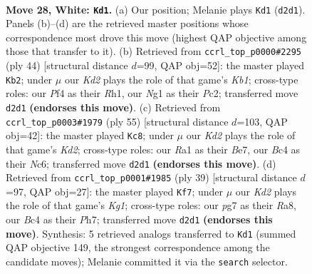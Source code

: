 \documentclass[11pt]{article}
\begin{document}
\clearpage

\begin{figure}[p]\centering
\begin{subfigure}{0.46\textwidth}\centering
\resizebox{\linewidth}{!}{%
\newchessgame
\chessboard[
  setfen={2r2b2/2nkn1pr/6b1/7p/p1B1pP1P/P3R3/1P1K2P1/R5NN w - - 16 28},
  showmover=false,
  pgfstyle=straightmove, color=movearrow, markmove={d2-d1}
]}
\caption{}
\end{subfigure}\hfill
\begin{subfigure}{0.46\textwidth}\centering
\resizebox{\linewidth}{!}{%
\newchessgame
\chessboard[
  setfen={4b2r/1pr1kpR1/p3p2p/1n2P3/5P2/1N6/P1P1B1PP/1K5R w - - 1 23},
  showmover=false,
  pgfstyle=straightmove, color=movearrow, markmove={b1-b2}
]}
\caption{}
\end{subfigure}
\\[4pt]
\begin{subfigure}{0.46\textwidth}\centering
\resizebox{\linewidth}{!}{%
\newchessgame
\chessboard[
  setfen={5r2/3kb3/ppn1p3/2pr4/P5p1/1P2P3/3NKPP1/1R1RB3 b - - 2 28},
  showmover=false,
  pgfstyle=straightmove, color=movearrow, markmove={d7-c8}
]}
\caption{}
\end{subfigure}\hfill
\begin{subfigure}{0.46\textwidth}\centering
\resizebox{\linewidth}{!}{%
\newchessgame
\chessboard[
  setfen={r3r1k1/1p5p/p2b1pp1/3p3n/3N4/3PB2P/PP3PP1/R3RK2 b - - 1 20},
  showmover=false,
  pgfstyle=straightmove, color=movearrow, markmove={g8-f7}
]}
\caption{}
\end{subfigure}
\caption{\textbf{Move 28, White: \texttt{Kd1}.} (a) Our position; Melanie plays \texttt{Kd1} (\texttt{d2d1}). Panels (b)--(d) are the retrieved master positions whose correspondence most drove this move (highest QAP objective among those that transfer to it). (b) Retrieved from \texttt{ccrl\_top\_p0000\#2295} (ply 44) [structural distance $d$=99, QAP obj=52]: the master played \texttt{Kb2}; under $\mu$ our \emph{Kd2} plays the role of that game's \emph{Kb1}; cross-type roles: our \emph{P}f4 as their \emph{R}h1, our \emph{N}g1 as their \emph{P}c2; transferred move \texttt{d2d1} \textbf{(endorses this move)}. (c) Retrieved from \texttt{ccrl\_top\_p0003\#1979} (ply 55) [structural distance $d$=103, QAP obj=42]: the master played \texttt{Kc8}; under $\mu$ our \emph{Kd2} plays the role of that game's \emph{Kd2}; cross-type roles: our \emph{R}a1 as their \emph{B}e7, our \emph{B}c4 as their \emph{N}c6; transferred move \texttt{d2d1} \textbf{(endorses this move)}. (d) Retrieved from \texttt{ccrl\_top\_p0001\#1985} (ply 39) [structural distance $d$=97, QAP obj=27]: the master played \texttt{Kf7}; under $\mu$ our \emph{Kd2} plays the role of that game's \emph{Kg1}; cross-type roles: our \emph{p}g7 as their \emph{R}a8, our \emph{B}c4 as their \emph{P}h7; transferred move \texttt{d2d1} \textbf{(endorses this move)}. Synthesis: 5 retrieved analogs transferred to \texttt{Kd1} (summed QAP objective 149, the strongest correspondence among the candidate moves); Melanie committed it via the \texttt{search} selector.}
\label{fig:thought-m54}
\end{figure}
\end{document}
